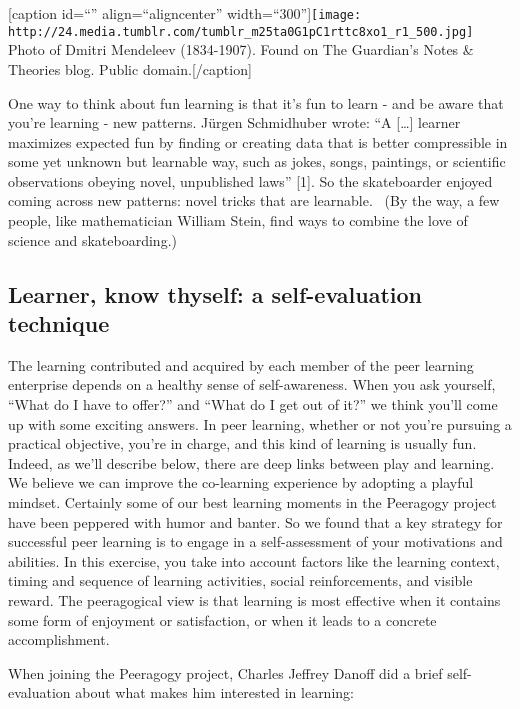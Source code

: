 {[}caption id=``'' align=``aligncenter''
width=``300''{]}\texttt{[image: http://24.media.tumblr.com/tumblr\_m25ta0G1pC1rttc8xo1\_r1\_500.jpg]}
Photo of Dmitri Mendeleev (1834-1907). Found on The Guardian's Notes \&
Theories blog. Public domain.{[}/caption{]}

One way to think about fun learning is that it's fun to learn - and be
aware that you're learning - new patterns. Jürgen Schmidhuber wrote: ``A
{[}\ldots{}{]} learner maximizes expected fun by finding or creating
data that is better compressible in some yet unknown but learnable way,
such as jokes, songs, paintings, or scientific observations obeying
novel, unpublished laws'' {[}1{]}. So the skateboarder enjoyed coming
across new patterns: novel tricks that are learnable.~ (By the way, a
few people, like mathematician William Stein, find ways to combine the
love of science and skateboarding.)

\subsection{Learner, know thyself: a self-evaluation technique}

The learning contributed and acquired by each member of the peer
learning enterprise depends on a healthy sense of self-awareness. When
you ask yourself, ``What do I have to offer?'' and ``What do I get out
of it?'' we think you'll come up with some exciting answers. In peer
learning, whether or not you're pursuing a practical objective, you're
in charge, and this kind of learning is usually fun. Indeed, as we'll
describe below, there are deep links between play and learning. We
believe we can improve the co-learning experience by adopting a playful
mindset. Certainly some of our best learning moments in the Peeragogy
project have been peppered with humor and banter. So we found that a key
strategy for successful peer learning is to engage in a self-assessment
of your motivations and abilities. In this exercise, you take into
account factors like the learning context, timing and sequence of
learning activities, social reinforcements, and visible reward. The
peeragogical view is that learning is most effective when it contains
some form of enjoyment or satisfaction, or when it leads to a concrete
accomplishment.

When joining the Peeragogy project, Charles Jeffrey Danoff did a brief
self-evaluation about what makes him interested in learning:

